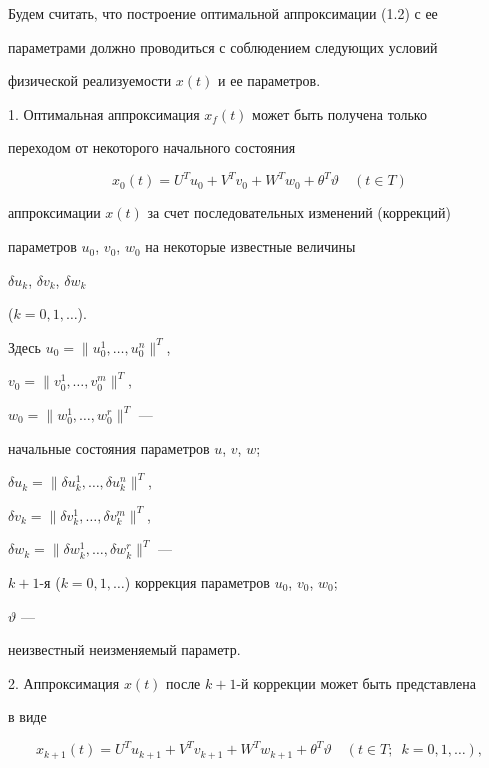  


Будем считать, что построение оптимальной аппроксимации (1.2) с ее 


параметрами должно проводиться с соблюдением следующих условий 


физической реализуемости $x(t)$ и ее параметров. 


 


1. Оптимальная аппроксимация $x_f(t)$ может быть получена только 


переходом от некоторого начального состояния 


\begin{equation} 


x_0(t)=U^T u_0+V^T v_0+W^T w_0+ 


\theta^T\vartheta\quad (t\in T) 


\end{equation} 


аппроксимации $x(t)$ за счет последовательных изменений (коррекций) 


параметров $u_0$, $v_0$, $w_0$ на некоторые известные величины 


$\delta u_k$, $\delta v_k$, $\delta w_k$ 


($k=0,1,\dotsc$). 


Здесь $u_0=\|u^1_0,\dotsc, u^n_0\|^T$, 


$v_0=\|v^1_0,\dotsc, v^m_0\|^T$, 


$w_0=\|w^1_0,\dotsc, w^r_0\|^T$ --- 


начальные состояния параметров $u$, $v$, $w$; 


$\delta u_k=\|\delta u^1_k,\dotsc, \delta u^n_k\|^T$, 


$\delta v_k=\|\delta v^1_k,\dotsc, \delta v^m_k\|^T$, 


$\delta w_k=\|\delta w^1_k,\dotsc, \delta w^r_k\|^T$ --- 


$k+1$-я ($k=0,1,\dotsc$) коррекция параметров $u_0$, $v_0$, $w_0$; 


$\vartheta$ --- 


неизвестный неизменяемый параметр. 


 


2. Аппроксимация $x(t)$ после $k+1$-й коррекции может быть представлена 


в виде 


\begin{equation} 


x_{k+1}(t)=U^T u_{k+1}+V^T v_{k+1}+W^T w_{k+1} 


+\theta^T\vartheta\quad (t\in T;\ \;k=0,1,\dotsc), 


\end{equation} 


